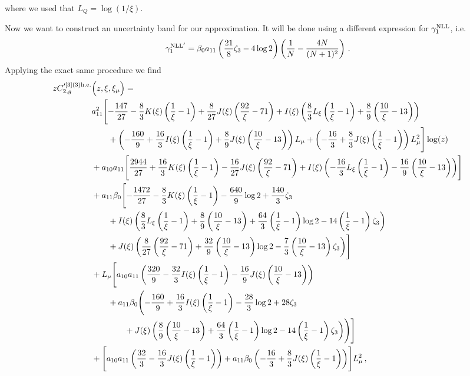 \documentclass[a4paper]{article}
\begin{document}
	\endgroup
where we used that $L_Q = \log\left(1/\xi\right)$.

Now we want to construct an uncertainty band for our approximation. It will be done using a different expression for $\gamma_1^{\rm NLL}$, i.e.\
\begin{equation}
	\gamma_1^{\rm NLL'} = \beta_0 a_{11} \left(\frac{21}{8} \zeta_3 - 4 \log 2\right)\left(\frac{1}{N} - \frac{4N}{(N+1)^2}\right)\,.
\end{equation}
Applying the exact same procedure we find
\begingroup
\allowdisplaybreaks
\begin{align}
		z C_{2,g}'^{[3](3) \rm h.e.}&\Bigl(z,\xi,\xi_\mu\Bigr)= \notag\\
		& a_{11}^2\Biggl[-\frac{147}{27} - \frac{8}{3} K(\xi) \left(\frac{1}{\xi}-1\right) + \frac{8}{27} J(\xi) \left(\frac{92}{\xi} - 71\right) + I(\xi) \left(\frac{8}{3} L_\xi \left(\frac{1}{\xi}-1\right) + \frac{8}{9} \left(\frac{10}{\xi} - 13\right)\right)\notag \\
		& \qquad + \left(-\frac{160}{9} + \frac{16}{3} I(\xi) \left(\frac{1}{\xi}-1\right) + \frac{8}{9} J(\xi) \left(\frac{10}{\xi} - 13\right)\right) L_\mu + \left(-\frac{16}{3} + \frac{8}{3} J(\xi) \left(\frac{1}{\xi}-1\right)\right) L_\mu^2\Biggr] \log(z) \notag\\
		& + a_{10} a_{11} \Biggl[\frac{2944}{27} + \frac{16}{3} K(\xi) \left(\frac{1}{\xi} - 1\right) - \frac{16}{27} J(\xi) \left(\frac{92}{\xi} - 71\right) + I(\xi) \left(-\frac{16}{3} L_\xi \left(\frac{1}{\xi} - 1\right) - \frac{16}{9} \left(\frac{10}{\xi} - 13\right)\right) \Biggr]\notag \\
		& + a_{11} \beta_0 \Biggl[ -\frac{1472}{27} - \frac{8}{3} K(\xi) \left(\frac{1}{\xi} - 1\right) - \frac{640}{9} \log 2 + \frac{140}{3} \zeta_3 \notag\\
		& \qquad + I(\xi) \left(\frac{8}{3} L_\xi \left(\frac{1}{\xi} - 1\right) + \frac{8}{9} \left(\frac{10}{\xi} - 13\right) + \frac{64}{3} \left(\frac{1}{\xi} - 1\right) \log 2 - 14 \left(\frac{1}{\xi} - 1\right) \zeta_3\right) \notag\\
		& \qquad + J(\xi) \left(\frac{8}{27} \left(\frac{92}{\xi} - 71\right) + \frac{32}{9} \left(\frac{10}{\xi} - 13\right) \log 2 - \frac{7}{3} \left(\frac{10}{\xi} - 13\right) \zeta_3 \right)\Biggr] \notag\\
		& + L_\mu \Biggl[a_{10} a_{11} \left(\frac{320}{9} - \frac{32}{3} I(\xi) \left(\frac{1}{\xi} - 1\right) - \frac{16}{9} J(\xi) \left(\frac{10}{\xi} - 13\right)\right)\notag \\
		& \qquad + a_{11} \beta_0 \Biggl(-\frac{160}{9} + \frac{16}{3} I(\xi) \left(\frac{1}{\xi} - 1\right) - \frac{28}{3} \log 2 + 28 \zeta_3 \notag\\
		& \qquad \qquad+ J(\xi) \left(\frac{8}{9} \left(\frac{10}{\xi} - 13\right) + \frac{64}{3} \left(\frac{1}{\xi} - 1\right) \log 2 - 14 \left(\frac{1}{\xi} - 1\right) \zeta_3 \right)\Biggr)\Biggr]\notag\\
		& + \Biggl[a_{10} a_{11} \left(\frac{32}{3} - \frac{16}{3} J(\xi) \left(\frac{1}{\xi} - 1\right)\right) + a_{11} \beta_0 \left(-\frac{16}{3} + \frac{8}{3} J(\xi) \left(\frac{1}{\xi} - 1\right)\right)\Biggr] L_\mu^2\,,
	\end{align}
\end{document}

